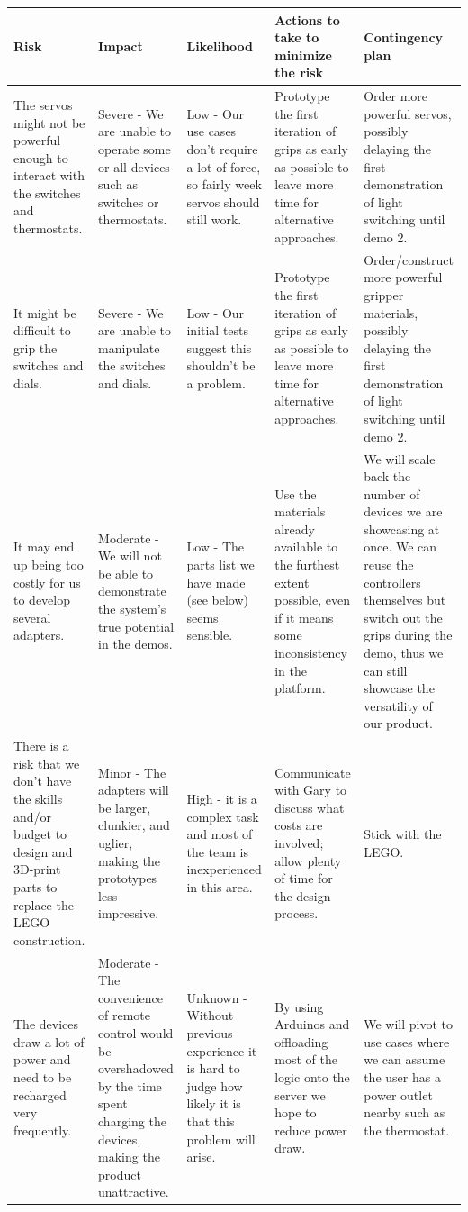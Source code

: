\documentclass[onecolumn]{IEEEtran}
\begin{document}
\begin{center}
    \begin{tabularx}{1.0\linewidth}{|L|L|L|L|L|}
        \hline
        \textbf{Risk} & \textbf{Impact} & \textbf{Likelihood} & \textbf{Actions to take to minimize the risk} & \textbf{Contingency plan} \\
        \hline
        The servos might not be powerful enough to interact with the switches and thermostats. & Severe - We are unable to operate some or all devices such as switches or thermostats. & Low - Our use cases don't require a lot of force, so fairly week servos should still work. & Prototype the first iteration of grips as early as possible to leave more time for alternative approaches. & Order more powerful servos, possibly delaying the first demonstration of light switching until demo 2. \\
        \hline
        It might be difficult to grip the switches and dials. & Severe - We are unable to manipulate the switches and dials. & Low - Our initial tests suggest this shouldn't be a problem. & Prototype the first iteration of grips as early as possible to leave more time for alternative approaches. & Order/construct more powerful gripper materials, possibly delaying the first demonstration of light switching until demo 2. \\
        \hline
        It may end up being too costly for us to develop several adapters. & Moderate - We will not be able to demonstrate the system’s true potential in the demos. & Low - The parts list we have made (see below) seems sensible. & Use the materials already available to the furthest extent possible, even if it means some inconsistency in the platform. & We will scale back the number of devices we are showcasing at once. We can reuse the controllers themselves but switch out the grips during the demo, thus we can still showcase the versatility of our product. \\
        \hline
        There is a risk that we don’t have the skills and/or budget to design and 3D-print parts to replace the LEGO construction. & Minor - The adapters will be larger, clunkier, and uglier, making the prototypes less impressive. & High - it is a complex task and most of the team is inexperienced in this area. & Communicate with Gary to discuss what costs are involved; allow plenty of time for the design process. & Stick with the LEGO. \\
        \hline
        The devices draw a lot of power and need to be recharged very frequently. & Moderate - The convenience of remote control would be overshadowed by the time spent charging the devices, making the product unattractive. & Unknown - Without previous experience it is hard to judge how likely it is that this problem will arise. & By using Arduinos and offloading most of the logic onto the server we hope to reduce power draw. & We will pivot to use cases where we can assume the user has a power outlet nearby such as the thermostat. \\

\end{tabularx}
\end{center}
\end{document}
